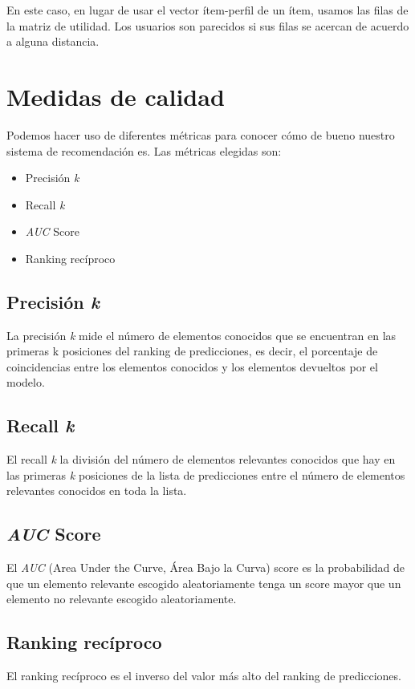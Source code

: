 En este caso, en lugar de usar el vector ítem-perfil de un ítem, usamos las filas de la matriz de utilidad. Los usuarios son parecidos si sus filas se acercan de acuerdo a alguna distancia.

\section{Medidas de calidad}\label{medidas-de-calidad}
Podemos hacer uso de diferentes métricas para conocer cómo de bueno nuestro sistema de recomendación es. Las métricas elegidas son:
\begin{itemize}
\tightlist
\item Precisión \textit{k}
\item Recall \textit{k}
\item \textit{AUC} Score
\item Ranking recíproco
\end{itemize}

\subsection{Precisión \textit{k}}\label{precision-k}
La precisión \textit{k} \cite{precision_at_k} mide el número de elementos conocidos que se encuentran en las primeras k posiciones del ranking de predicciones, es decir, el porcentaje de coincidencias entre los elementos conocidos y los elementos devueltos por el modelo.

\subsection{Recall \textit{k}}\label{recall-k}
El recall \textit{k} \cite{recall_at_k} la división del número de elementos relevantes conocidos que hay en las primeras \textit{k} posiciones de la lista de predicciones entre el número de elementos relevantes conocidos en toda la lista.

\subsection{\textit{AUC} Score}\label{auc-score}
El \textit{AUC} (Area Under the Curve, Área Bajo la Curva) score \cite{auc_score} es la probabilidad de que un elemento relevante escogido aleatoriamente tenga un score mayor que un elemento no relevante escogido aleatoriamente.

\subsection{Ranking recíproco}\label{ranking-reciproco}
El ranking recíproco \cite{reciprocal_rank} es el inverso del valor más alto del ranking de predicciones.

